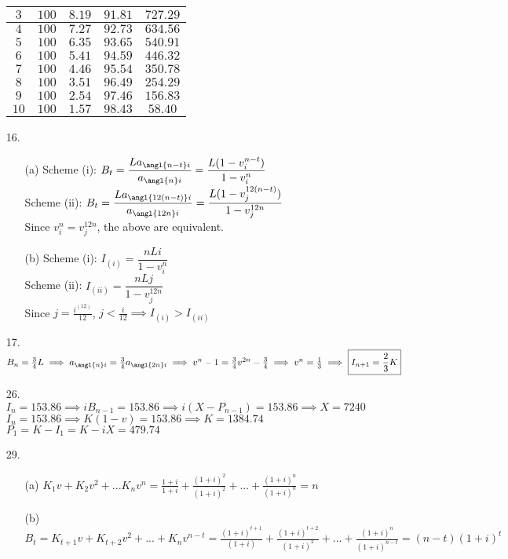\documentclass{article}
\begin{document}
\begin{itemize}
\begin{tabular}{|c|c|c|c|c|}
		      \hline
		      $3$  & $100$ & $8.19$ & $91.81$ & $727.29$ \\
		      \hline
		      $4$  & $100$ & $7.27$ & $92.73$ & $634.56$ \\
		      \hline
		      $5$  & $100$ & $6.35$ & $93.65$ & $540.91$ \\
		      \hline
		      $6$  & $100$ & $5.41$ & $94.59$ & $446.32$ \\
		      \hline
		      $7$  & $100$ & $4.46$ & $95.54$ & $350.78$ \\
		      \hline
		      $8$  & $100$ & $3.51$ & $96.49$ & $254.29$ \\
		      \hline
		      $9$  & $100$ & $2.54$ & $97.46$ & $156.83$ \\
		      \hline
		      $10$ & $100$ & $1.57$ & $98.43$ & $58.40$ \\
		      \hline
	      \end{tabular}
	\item [16.]
	      \begin{itemize}
		      \item [(a)] Scheme (i): $B_t=\dfrac{La_{\angl{n-t}i}}{a_{\angl{n}i}}=\dfrac{L(1-v_i^{n-t})}{1-v_i^n}$\\Scheme (ii): $B_t=\dfrac{La_{\angl{12(n-t)}i}}{a_{\angl{12n}i}}=\dfrac{L(1-v_j^{12(n-t)})}{1-v_j^{12n}}$\\Since $v_i^n=v_j^{12n}$, the above are equivalent.
		      \item [(b)] Scheme (i): $I_{(i)}=\dfrac{nLi}{1-v_i^n}$\\Scheme (ii): $I_{(ii)}=\dfrac{nLj}{1-v_j^{12n}}$\\Since $j=\frac{i^{(12)}}{12}$, $j<\frac{i}{12} \implies I_{(i)}>I_{(ii)}$
	      \end{itemize}
	\item [17.] $B_n=\frac{3}{4}L \implies a_{\angl{n}i}=\frac{3}{4}a_{\angl{2n}i} \implies v^n-1=\frac{3}{4}v^{2n}-\frac{3}{4} \implies v^n=\frac{1}{3} \implies \boxed{I_{n+1}=\frac{2}{3}K}$
	\item [26.]	$I_n=153.86 \implies iB_{n-1}=153.86 \implies i(X-P_{n-1})=153.86 \implies X=7240$\\$I_n=153.86 \implies K(1-v)=153.86 \implies K=1384.74$\\$P_1=K-I_1=K-iX=\boxed{479.74}$
	\item [29.]
	      \begin{itemize}
		      \item [(a)] $K_1v+K_2v^2+...K_nv^n=\frac{1+i}{1+i}+\frac{(1+i)^2}{(1+i)^2}+...+\frac{(1+i)^n}{(1+i)^n}=n$
		      \item [(b)] $B_t=K_{t+1}v+K_{t+2}v^2+...+K_nv^{n-t}=\frac{(1+i)^{t+1}}{(1+i)}+\frac{(1+i)^{t+2}}{(1+i)^2}+...+\frac{(1+i)^n}{(1+i)^{n-t}}=(n-t)(1+i)^t$
	      \end{itemize}
\end{itemize}
\end{document}
